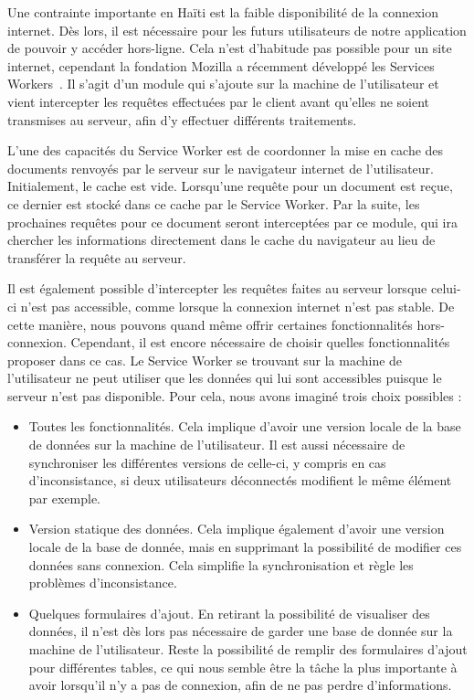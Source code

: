 \documentclass{EPL-master-thesis-covers-FR}
\begin{document}
				Une contrainte importante en Haïti est la faible disponibilité de la connexion internet. Dès lors, il est nécessaire pour les futurs utilisateurs de notre application de pouvoir y accéder hors-ligne. Cela n'est d'habitude pas possible pour un site internet, cependant la fondation Mozilla a récemment développé les Services Workers~\cite{ref:serviceworker}. Il s'agit d'un module qui s'ajoute sur la machine de l'utilisateur et vient intercepter les requêtes effectuées par le client avant qu'elles ne soient transmises au serveur, afin d'y effectuer différents traitements.

				L'une des capacités du Service Worker est de coordonner la mise en cache des documents renvoyés par le serveur sur le navigateur internet de l'utilisateur. Initialement, le cache est vide. Lorsqu'une requête pour un document est reçue, ce dernier est stocké dans ce cache par le Service Worker. Par la suite, les prochaines requêtes pour ce document seront interceptées par ce module, qui ira chercher les informations directement dans le cache du navigateur au lieu de transférer la requête au serveur.

				Il est également possible d'intercepter les requêtes faites au serveur lorsque celui-ci n'est pas accessible, comme lorsque la connexion internet n'est pas stable. De cette manière, nous pouvons quand même offrir certaines fonctionnalités hors-connexion. Cependant, il est encore nécessaire de choisir quelles fonctionnalités proposer dans ce cas. Le Service Worker se trouvant sur la machine de l'utilisateur ne peut utiliser que les données qui lui sont accessibles puisque le serveur n'est pas disponible. Pour cela, nous avons imaginé trois choix possibles :

				\begin{itemize}
					\item Toutes les fonctionnalités. Cela implique d'avoir une version locale de la base de données sur la machine de l'utilisateur. Il est aussi nécessaire de synchroniser les différentes versions de celle-ci, y compris en cas d'inconsistance, si deux utilisateurs déconnectés modifient le même élément par exemple.
					\item Version statique des données. Cela implique également d'avoir une version locale de la base de donnée, mais en supprimant la possibilité de modifier ces données sans connexion. Cela simplifie la synchronisation et règle les problèmes d'inconsistance.
					\item Quelques formulaires d'ajout. En retirant la possibilité de visualiser des données, il n'est dès lors pas nécessaire de garder une base de donnée sur la machine de l'utilisateur. Reste la possibilité de remplir des formulaires d'ajout pour différentes tables, ce qui nous semble être la tâche la plus importante à avoir lorsqu'il n'y a pas de connexion, afin de ne pas perdre d'informations.
				\end{itemize}
\end{document}
